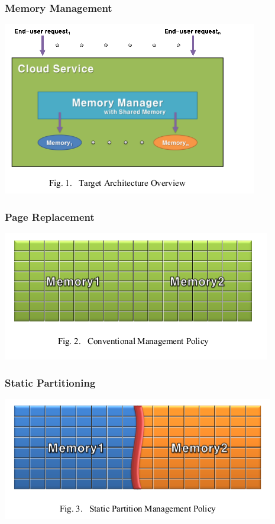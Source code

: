 \documentclass{beamer}
\begin{document}
\begin{frame}

\frametitle{Memory Management}
\begin{center}
\includegraphics[width=\textwidth]{memory-arch}
\end{center}

\end{frame}


\begin{frame}

\frametitle{Page Replacement}
\begin{center}
\includegraphics[width=\textwidth]{conventional}
\end{center}

\end{frame}


\begin{frame}

\frametitle{Static Partitioning}
\begin{center}
\includegraphics[width=\textwidth]{static}
\end{center}

\end{frame}
\end{document}
